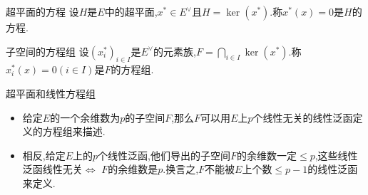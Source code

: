 \begin{definition}{超平面的方程}{}
	设$H$是$E$中的超平面,$x^{\ast}\in E^{\vee}$且$H=\ker\left(x^{\ast}\right)$.称$x^{\ast}\left(x\right)=0$是$H$的方程.
\end{definition}

\begin{definition}{子空间的方程组}{}
	设$\left(x_{i}^{\ast}\right)_{i\in I}$是$E^{\vee}$的元素族,$F=\bigcap\limits_{i\in I}\ker\left(x^{\ast}\right)$.称$x_{i}^{\ast}\left(x\right)=0\left(i\in I\right)$是$F$的方程组.
\end{definition}

\begin{remark}{超平面和线性方程组}{}
	\begin{itemize}
		\item 给定$E$的一个余维数为$p$的子空间$F$,那么$F$可以用$E$上$p$个线性无关的线性泛函定义的方程组来描述.
		\item 相反,给定$E$上的$p$个线性泛函,他们导出的子空间$F$的余维数一定$\leq p$,这些线性泛函线性无关$\iff$ $F$的余维数是$p$.换言之,$F$不能被$E$上个数$\leq p-1$的线性泛函来定义.
	\end{itemize}
\end{remark}







